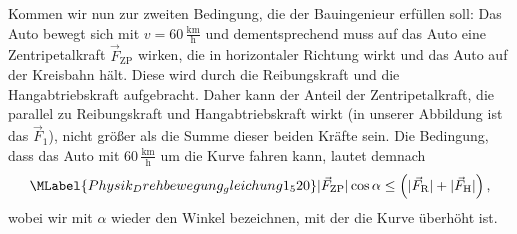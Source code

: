 \begin{MExercises}
\begin{MExercise}
\begin{MSolution}
 
  
  Kommen wir nun zur zweiten Bedingung, die der Bauingenieur erf\"ullen soll: Das Auto bewegt sich mit $v=60\,\frac{\text{km}}{\text{h}}$ und dementsprechend muss auf das Auto eine Zentripetalkraft $\vec{F}_{\textrm{ZP}}$ wirken, die in horizontaler Richtung wirkt und das Auto auf der Kreisbahn h\"alt. Diese wird durch die Reibungskraft und die Hangabtriebskraft aufgebracht. Daher kann der Anteil der Zentripetalkraft, die parallel zu Reibungskraft und Hangabtriebskraft wirkt (in unserer Abbildung ist das $\vec{F}_{\textrm{1}}$), nicht gr\"o{\ss}er als die Summe dieser beiden Kr\"afte sein. Die Bedingung, dass das Auto mit $60\,\frac{\text{km}}{\text{h}}$ um die Kurve fahren kann, lautet demnach
  \begin{equation}\MLabel{Physik_Drehbewegung_gleichung1_520}
  \vert\vec{F}_{\textrm{ZP}}\vert\cos\alpha\le\left(\vert\vec{F}_{\textrm{R}}\vert+\vert\vec{F}_{\textrm{H}}\vert\right),
  \end{equation} wobei wir mit $\alpha$ wieder den Winkel bezeichnen, mit der die Kurve \"uberh\"oht ist.
  
  
  

\end{MSolution}
\end{MExercise}
\end{MExercises}
